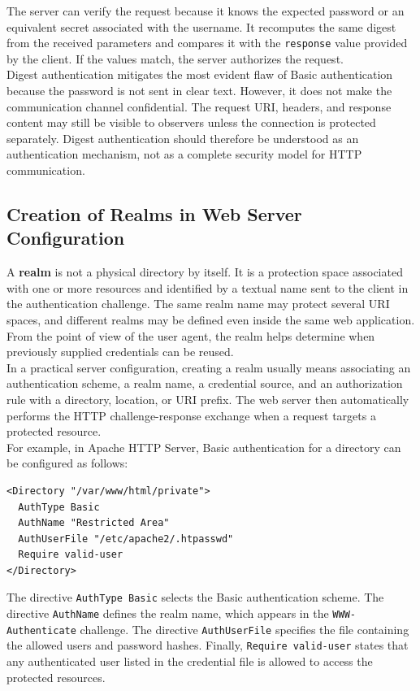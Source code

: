 \documentclass{scrbook}
\begin{document}
The server can verify the request because it knows the expected password or an equivalent secret associated with the username. It recomputes the same digest from the received parameters and compares it with the \texttt{response} value provided by the client. If the values match, the server authorizes the request.\\

Digest authentication mitigates the most evident flaw of Basic authentication because the password is not sent in clear text. However, it does not make the communication channel confidential. The request URI, headers, and response content may still be visible to observers unless the connection is protected separately. Digest authentication should therefore be understood as an authentication mechanism, not as a complete security model for HTTP communication.

\subsection{Creation of Realms in Web Server Configuration}

A \textbf{realm} is not a physical directory by itself. It is a protection space associated with one or more resources and identified by a textual name sent to the client in the authentication challenge. The same realm name may protect several URI spaces, and different realms may be defined even inside the same web application. From the point of view of the user agent, the realm helps determine when previously supplied credentials can be reused.\\

In a practical server configuration, creating a realm usually means associating an authentication scheme, a realm name, a credential source, and an authorization rule with a directory, location, or URI prefix. The web server then automatically performs the HTTP challenge-response exchange when a request targets a protected resource.\\

For example, in Apache HTTP Server, Basic authentication for a directory can be configured as follows:

\begin{lstlisting}
<Directory "/var/www/html/private">
  AuthType Basic
  AuthName "Restricted Area"
  AuthUserFile "/etc/apache2/.htpasswd"
  Require valid-user
</Directory>
\end{lstlisting}

The directive \texttt{AuthType Basic} selects the Basic authentication scheme. The directive \texttt{AuthName} defines the realm name, which appears in the \texttt{WWW-Authenticate} challenge. The directive \texttt{AuthUserFile} specifies the file containing the allowed users and password hashes. Finally, \texttt{Require valid-user} states that any authenticated user listed in the credential file is allowed to access the protected resources.\\
\end{document}
